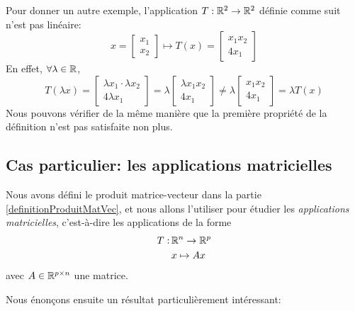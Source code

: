 Pour donner un autre exemple, l'application $T: \mathbb{R}^2 \to \mathbb{R}^2$ définie comme suit n'est pas linéaire:
$$x = \begin{bmatrix} x_1 \\ x_2 \end{bmatrix} \mapsto T(x) = \begin{bmatrix} x_1 x_2 \\ 4x_1 \end{bmatrix}$$
En effet, $\forall \lambda \in \mathbb{R}$,
$$T(\lambda x) = \begin{bmatrix} \lambda x_1 \cdot \lambda x_2 \\ 4\lambda x_1\end{bmatrix} = \lambda \begin{bmatrix} \lambda x_1 x_2 \\ 4x_1 \end{bmatrix} \neq \lambda \begin{bmatrix}  x_1 x_2 \\ 4x_1 \end{bmatrix} = \lambda T(x)$$
Nous pouvons vérifier de la même manière que la première propriété de la définition n'est pas satisfaite non plus.

\subsection{Cas particulier: les applications matricielles}
Nous avons défini le produit matrice-vecteur dans la partie \ref{definitionProduitMatVec}, et nous allons l'utiliser pour étudier les \textit{applications matricielles}, c'est-à-dire les applications de la forme
\begin{align*}
    T: \, &\mathbb{R}^n \to \mathbb{R}^p \\
    & x \mapsto Ax
\end{align*}
avec $A \in \mathbb{R}^{p \times n}$ une matrice. 

Nous énonçons ensuite un résultat  particulièrement intéressant:

